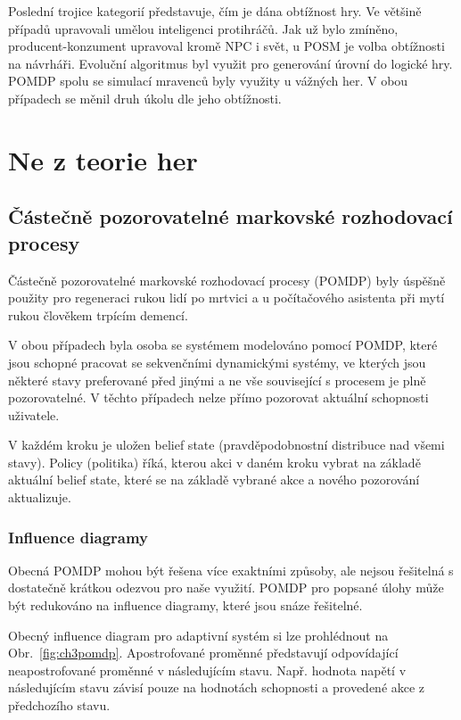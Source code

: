 Poslední trojice kategorií představuje, čím je dána obtížnost hry. Ve většině případů upravovali umělou inteligenci protihráčů. Jak už bylo zmíněno, producent-konzument upravoval kromě NPC i svět, u POSM je volba obtížnosti na návrháři. Evoluční algoritmus byl využit pro generování úrovní do logické hry. POMDP spolu se simulací mravenců byly využity u vážných her. V obou případech se měnil druh úkolu dle jeho obtížnosti.

\section{Ne z teorie her}

\subsection{Částečně pozorovatelné markovské rozhodovací procesy} \label{sec:POMDP}

Částečně pozorovatelné markovské rozhodovací procesy (POMDP) byly úspěšně použity pro regeneraci rukou lidí po mrtvici \cite{9Pomdp} a u počítačového asistenta při mytí rukou člověkem trpícím demencí.

V obou případech byla osoba se systémem modelováno pomocí POMDP, které jsou schopné pracovat se sekvenčními dynamickými systémy, ve kterých jsou některé stavy preferované před jinými a ne vše související s procesem je plně pozorovatelné. V těchto případech nelze přímo pozorovat aktuální schopnosti uživatele.

V každém kroku je uložen belief state (pravděpodobnostní distribuce nad všemi stavy). Policy (politika) říká, kterou akci v daném kroku vybrat na základě aktuální belief state, které se na základě vybrané akce a nového pozorování aktualizuje.

\subsubsection{Influence diagramy}

Obecná POMDP mohou být řešena více exaktními způsoby, ale nejsou řešitelná s dostatečně krátkou odezvou pro naše využití. POMDP pro popsané úlohy může být redukováno na influence diagramy, které jsou snáze řešitelné.
 
Obecný influence diagram pro adaptivní systém si lze prohlédnout na Obr.~\ref{fig:ch3pomdp}. Apostrofované proměnné představují odpovídající neapostrofované proměnné v následujícím stavu. Např. hodnota napětí v následujícím stavu závisí pouze na hodnotách schopnosti a provedené akce z předchozího stavu.

